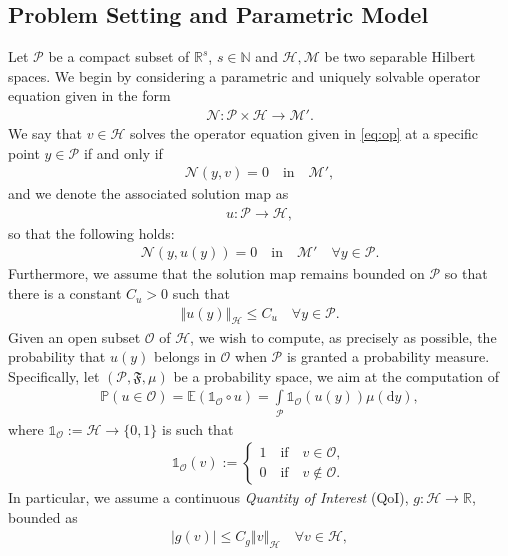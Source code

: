 \documentclass{article}
\newcommand{\cH}{\mathcal{H}}
\newcommand{\cO}{\mathcal{O}}
\newcommand{\cP}{\mathcal{P}}
\newcommand{\cM}{\mathcal{M}}
\newcommand{\cN}{\mathcal{N}}
\newcommand{\fF}{\mathfrak{F}}
\newcommand{\IE}{\mathbb{E}}
\newcommand{\IN}{\mathbb{N}}
\newcommand{\IP}{\mathbb{P}}
\newcommand{\IR}{\mathbb{R}}
\newcommand{\bOne}{\mathds{1}}
\renewcommand{\d}{{\text{d}}}
\newcommand{\dy}{{\d y}}
\newcommand{\norm}[2]{{\left\Vert #2 \right\Vert}_{#1}}
\newcommand{\abs}[1]{{\left\vert #1 \right\vert}}
\newcommand{\probspace}{\cP, \fF, \mu}
\newcommand{\probspacepar}{(\probspace )}
\theoremstyle{definition}
\begin{document}
\subsection{Problem Setting and Parametric Model}
\label{ssec:parpde}
Let $\cP$ be a compact subset of $\IR^s$, $s\in\IN$ and $\cH, \cM$ be two separable
Hilbert spaces. We begin by considering a parametric and uniquely solvable
operator equation given in the form
\begin{align}
  \label{eq:op}
  \cN:\cP\times\cH\to\cM'.
\end{align}
We say that $v\in\cH$ solves the operator equation given in \cref{eq:op} at a specific
point $y\in\cP$ if and only if
\begin{align}
  \label{eq:opEq}
  \cN(y, v) = 0\quad\text{in}\quad \cM',
\end{align}
and we denote the associated solution map as
\begin{align}
  \label{eq:solMap}
  u:\cP\to\cH,
\end{align}
so that the following holds:
\begin{align}
\cN(y,u(y)) = 0\quad\text{in}\quad \cM'\quad\forall y\in\cP.
\end{align}
Furthermore, we assume that the solution map remains bounded on $\cP$ so that
there is a constant $C_u>0$ such that
\begin{align}
  \label{eq:ubound}
    \norm{\cH}{u(y)}\leq C_u\quad\forall y\in\cP.
  \end{align}
Given an open subset $\cO$ of $\cH$, we wish to compute, as precisely as possible, the
probability that $u(y)$ belongs in $\cO$ when $\cP$ is granted a probability measure.
Specifically, let $\probspacepar$ be a probability space, we aim at the computation of
\begin{align}
  \label{eq:probaDefi}
  \IP(u\in\cO)=\IE\left(\bOne_{\cO}\circ u\right)=\int\limits_{\cP}\bOne_{\cO}(u(y))\mu(\dy),
\end{align}
where $\bOne_{\cO}:=\cH\to\{0,1\}$ is such that
\begin{align}
  \bOne_{\cO}(v):=
  \begin{cases}
    1\quad\text{if}\quad v\in\cO,\\
    0\quad\text{if}\quad v\not\in\cO.
  \end{cases}
\end{align}
In particular, we assume a continuous \emph{Quantity of Interest} (QoI), $g:\cH\to\IR$, bounded as
\begin{align}
  \label{eq:gbound}
  \abs{g(v)}\leq C_g\norm{\cH}{v}\quad \forall v\in\cH,
\end{align}
\end{document}
